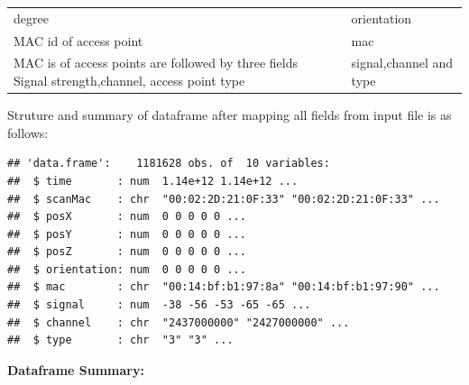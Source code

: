 \documentclass[
]{article}
\begin{document}
\begin{longtable}[]{@{}lcl@{}}
\begin{minipage}[t]{0.25\columnwidth}
degree\strut
\end{minipage} & \begin{minipage}[t]{0.22\columnwidth}\centering
1\strut
\end{minipage} & \begin{minipage}[t]{0.44\columnwidth}\raggedright
orientation\strut
\end{minipage}\tabularnewline
\begin{minipage}[t]{0.25\columnwidth}\raggedright
MAC id of access point\strut
\end{minipage} & \begin{minipage}[t]{0.22\columnwidth}\centering
1\strut
\end{minipage} & \begin{minipage}[t]{0.44\columnwidth}\raggedright
mac\strut
\end{minipage}\tabularnewline
\begin{minipage}[t]{0.25\columnwidth}\raggedright
MAC is of access points are followed by three fields Signal
strength,channel, access point type\strut
\end{minipage} & \begin{minipage}[t]{0.22\columnwidth}\centering
3\strut
\end{minipage} & \begin{minipage}[t]{0.44\columnwidth}\raggedright
signal,channel and type\strut
\end{minipage}\tabularnewline
\bottomrule
\end{longtable}

Struture and summary of dataframe after mapping all fields from input
file is as follows:

\begin{verbatim}
## 'data.frame':    1181628 obs. of  10 variables:
##  $ time       : num  1.14e+12 1.14e+12 ...
##  $ scanMac    : chr  "00:02:2D:21:0F:33" "00:02:2D:21:0F:33" ...
##  $ posX       : num  0 0 0 0 0 ...
##  $ posY       : num  0 0 0 0 0 ...
##  $ posZ       : num  0 0 0 0 0 ...
##  $ orientation: num  0 0 0 0 0 ...
##  $ mac        : chr  "00:14:bf:b1:97:8a" "00:14:bf:b1:97:90" ...
##  $ signal     : num  -38 -56 -53 -65 -65 ...
##  $ channel    : chr  "2437000000" "2427000000" ...
##  $ type       : chr  "3" "3" ...
\end{verbatim}

\textbf{Dataframe Summary:}
\end{document}
